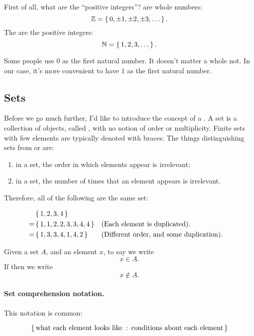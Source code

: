 First of all, what are the ``positive integers''?  are
whole numbers: $$\mathbb{Z} = \left\{\, 0, \pm 1, \pm 2, \pm 3, \dots \,\right\}.$$ The
 are the positive integers:
$$\mathbb{N} = \left\{\, 1,2,3,\dots \,\right\}.$$

\begin{remark}
  Some people use $0$ as the first natural number. It doesn't matter a
  whole not. In our case, it's more convenient to have $1$ as the
  first natural number.
\end{remark}

\subsection{Sets}

Before we go much further, I'd like to introduce the concept of a
. A set is a collection of objects, called ,
with no notion of order or multiplicity. Finite sets with few elements
are typically denoted with braces: 
The things distinguishing sets from  or 
are:

\begin{enumerate}
\item in a set, the order in which elements appear is irrelevant;
\item in a set, the number of times that an element appears is
  irrelevant.
\end{enumerate}

Therefore, all of the following are the same set:

\begin{align*}
  & \left\{\, 1,2,3,4 \,\right\} \\
  = & \left\{\, 1,1,2,2,3,3,4,4 \,\right\} && \text{(Each element is duplicated).} \\
  = & \left\{\, 1, 3, 3, 4, 1, 4, 2 \,\right\} && \text{(Different order, and some duplication).}
\end{align*}

Given a set $A$, and an element $x$, to say  we write $$x \in A.$$ If  then we write $$x \notin A.$$

\paragraph{Set comprehension notation.}

This notation is common:

\begin{equation*}
  \left\{\, \text{what each element looks like} \::\: \text{conditions about
      each element} \,\right\}
\end{equation*}

